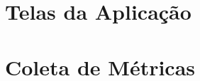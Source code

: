 \begin{anexosenv}

\partanexos

\chapter{Telas da Aplicação}
\label{chap:telas}

\chapter{Coleta de Métricas}
\label{chap:metricas}

\end{anexosenv}


